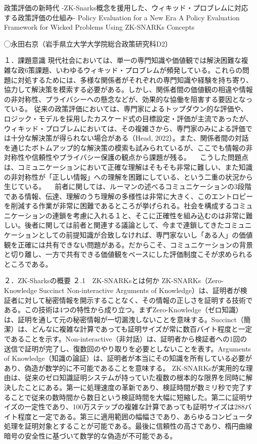 政策評価の新時代
-ZK-Snarks概念を援用した、ウィキッド・プロブレムに対応する政策評価の仕組み-
Policy Evaluation for a New Era A Policy Evaluation Framework for Wicked
Problems Using ZK-SNARKs Concepts

◯永田右京（岩手県立大学大学院総合政策研究科D2）

１．課題意識
現代社会においては、単一の専門知識や価値観では解決困難な複雑な政6策課題、いわゆるウィキッド・プロブレムが頻発している。これらの問題に対処するためには、多様な関係者がそれぞれの専門知識や経験を持ち寄り、協力して解決策を模索する必要がある。しかし、関係者間の価値観の相違や情報の非対称性、プライバシーへの懸念などが、効果的な協働を阻害する要因となっている。
従来の政策評価においては、専門家によるトップダウン的な評価や、ロジック・モデルを採用したカスケード式の目標設定・評価が主流であったが、ウィキッド・プロブレムにおいては、その複雑さから、専門家のみによる評価では十分な解決策が得られない場合がある（Head,
2022）。また、関係者間の対話を通じたボトムアップ的な解決策の模索も試みられているが、ここでも情報の非対称性や信頼性やプライバシー保護の観点から課題が残る。
　こうした問題点は、コミュニケーションにおいて正確な理解はそもそも非常に難しい、また知識の非対称性が「正しい情報」への理解を困難にしている、という二重の状況から生じている。
　前者に関しては、ルーマンの述べるコミュニケーションの3段階である情報、伝達、理解のうち理解の多様性は非常に大きく、このエントロピーを削減する作業が非常に困難であるところが挙げられる。社会を構成するコミュニケーションの連鎖を考慮に入れる１と、そこに正確性を組み込むのは非常に難しい。後者に関しては前者と関連する議論として、今まで連鎖してきたコミュニケーションとしての前提知識が合致しなければ、専門家ないし「ある人」の価値観を正確には共有できない問題がある。だからこそ、コミュニケーションの背景と切り離し、一方で共有できる価値観をベースにした評価制度こそが求められるところである。

２．ZK-Sharksの概要 ２.1　ZK-SNARKsとは何か ZK-SNARKs（Zero-Knowledge
Succinct Non-interactive Arguments of
Knowledge）は、証明者が検証者に対して秘密情報を開示することなく、その情報の正しさを証明する技術である。この技術は4つの特性から成り立つ。まずZero-Knowledge（ゼロ知識）は、証明を通して元の秘密情報が一切漏洩しないことを意味する。Succinct（簡潔）は、どんなに複雑な計算であっても証明サイズが常に数百バイト程度と一定であることを示す。Non-interactive（非対話）は、証明者から検証者への1回の送信で証明が完了し、復数回のやり取りを必要としないことを表す。Arguments
of
Knowledge（知識の論証）は、証明者が本当にその知識を所有している必要があり、偽造が数学的に不可能であることを意味する。
ZK-SNARKsが実用的な理由は、従来のゼロ知識証明システムが持っていた複数の根本的な限界を同時に解決したことにある。第一に処理速度の革新であり、検証時間が数ミリ秒で完了することで従来の数時間から数日という検証時間を大幅に短縮した。第二に証明サイズの一定性であり、100万ステップの複雑な計算であっても証明サイズは288バイト程度と一定である。第三に適用範囲の幅幅さであり、あらゆるコンピュータ処理を証明対象とすることが可能である。最後に信頼性の高さであり、楕円曲線暗号の安全性に基づいて数学的な偽造が不可能である。


